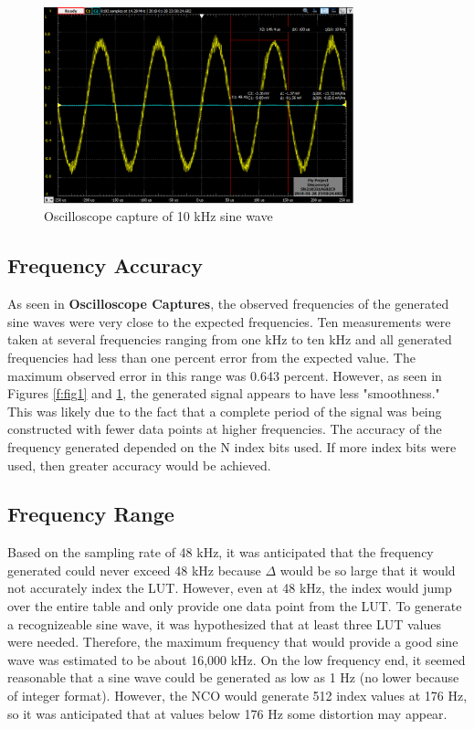 \documentclass[11pt,pdftex,portrait,letterpaper]{article}
\begin{document}
\begin{figure}[h]
\centering
\includegraphics[width=0.8\textwidth]{./10000hzOscope}
\caption{Oscilloscope capture of 10 kHz sine wave}
\label{f:fig2}
\end{figure}

\subsection{Frequency Accuracy}

As seen in \textbf{Oscilloscope Captures}, the observed frequencies of the generated sine waves were very close to the expected frequencies. Ten measurements were taken at several frequencies ranging from one kHz to ten kHz and all generated frequencies had less than one percent error from the expected value. The maximum observed error in this range was 0.643 percent. However, as seen in Figures \ref{f:fig1} and \ref{f:fig2}, the generated signal appears to have less "smoothness." This was likely due to the fact that a complete period of the signal was being constructed with fewer data points at higher frequencies. The accuracy of the frequency generated depended on the N index bits used. If more index bits were used, then greater accuracy would be achieved. 

\subsection{Frequency Range}

Based on the sampling rate of 48 kHz, it was anticipated that the frequency generated could never exceed 48 kHz because $\Delta$ would be so large that it would not accurately index the LUT. However, even at 48 kHz, the index would jump over the entire table and only provide one data point from the LUT. To generate a recognizeable sine wave, it was hypothesized that at least three LUT values were needed. Therefore, the maximum frequency that would provide a good sine wave was estimated to be about 16,000 kHz. On the low frequency end, it seemed reasonable that a sine wave could be generated as low as 1 Hz (no lower because of integer format). However, the NCO would generate 512 index values at 176 Hz, so it was anticipated that at values below 176 Hz some distortion may appear. 
\end{document}
